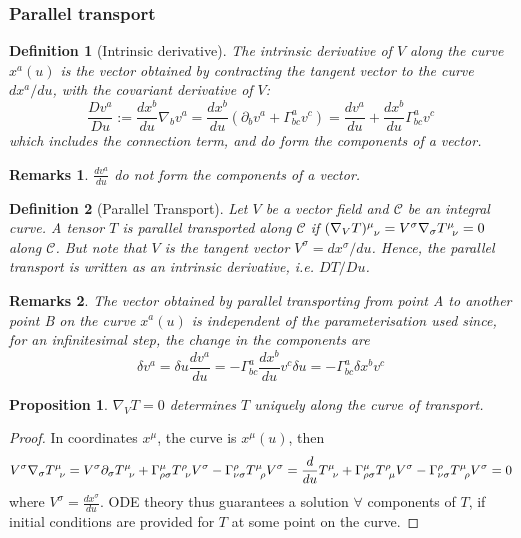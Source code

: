 \documentclass[a4paper]{article}
\newtheorem{remarks}{Remarks}[section]
\theoremstyle{new}
\newtheorem{defi}{Definition}[section]
\newtheorem{prop}{Proposition}[section]
\begin{document}
\subsubsection{Parallel transport}
\begin{defi}[Intrinsic derivative]
The intrinsic derivative of $V$ along the curve $x^a(u)$ is the vector obtained by contracting the tangent vector to the curve $dx^a/du$, with the covariant derivative of $V$:
\begin{equation}
\frac{Dv^a}{Du}:=\frac{dx^b}{du}\nabla_bv^a=\frac{dx^b}{du}(\partial_bv^a+\Gamma_{bc}^av^c)=\frac{dv^a}{du}+\frac{dx^b}{du}\Gamma_{bc}^av^c\label{intrinsicderiv}
\end{equation}
which includes the connection term, and do form the components of a vector.
\end{defi}
\begin{remarks}
$\frac{dv^a}{du}$ do not form the components of a vector.
\end{remarks}
\begin{defi}[Parallel Transport]
Let $V$ be a vector field and $\mathcal{C}$ be an integral curve. A tensor $T$ is parallel transported along $\mathcal{C}$ if $\tensor*{(\nabla_VT)}{*_{}^{\mu}_{\nu}}=V^\sigma\nabla_\sigma\tensor*{T}{*_{}^{\mu}_{\nu}}=0$ along $\mathcal{C}$. But note that $V$ is the tangent vector $V^\sigma=dx^\sigma/du$. Hence, the parallel transport is written as an intrinsic derivative, i.e. $DT/Du$.
\end{defi}
\begin{remarks}
The vector obtained by parallel transporting from point A to another point B on the curve $x^a(u)$ is independent of the parameterisation used since, for an infinitesimal step, the change in the components are
$$\delta v^a=\delta u\frac{dv^a}{du}=-\Gamma^a_{bc}\frac{dx^b}{du}v^c\delta u=-\Gamma^a_{bc}\delta x^bv^c$$
\end{remarks}
\begin{prop}
$\nabla_VT=0$ determines $T$ uniquely along the curve of transport.
\end{prop}
\begin{proof}
In coordinates $x^\mu$, the curve is $x^\mu(u)$, then
$$V^\sigma\nabla_\sigma \tensor*{T}{*_{}^{\mu}_{\nu}}=V^\sigma\partial_\sigma \tensor*{T}{*_{}^{\mu}_{\nu}}+\Gamma_{\rho\sigma}^\mu \tensor*{T}{*_{}^{\rho}_{\nu}}V^\sigma-\Gamma_{\nu\sigma}^\rho \tensor*{T}{*_{}^{\mu}_{\rho}}V^\sigma=\frac{d}{du}\tensor*{T}{*_{}^{\mu}_{\nu}}+\Gamma_{\rho\sigma}^\mu\tensor*{T}{*_{}^{\rho}_{\mu}}V^\sigma-\Gamma_{\nu\sigma}^\rho \tensor*{T}{*_{}^{\mu}_{\rho}}V^\sigma=0$$
where $V^\sigma=\frac{dx^\sigma}{du}$. ODE theory thus guarantees a solution $\forall$ components of $T$, if initial conditions are provided for $T$ at some point on the curve.
\end{proof}
\end{document}
